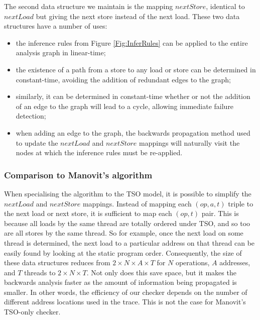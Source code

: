 \documentclass[11pt]{article}
\begin{document}
The second data structure we maintain is the mapping $nextStore$,
identical to $nextLoad$ but giving the next store instead of the next
load.  These two data structures have a number of uses:

\begin{itemize}

\item the inference rules from Figure \ref{Fig:InferRules} can be
applied to the entire analysis graph in linear-time;

\item the existence of a path from a store to any load or store can
be determined in constant-time, avoiding the addition of
redundant edges to the graph;

\item similarly, it can be determined in constant-time whether or not
the addition of an edge to the graph will lead to a cycle, allowing
immediate failure detection;

\item when adding an edge to the graph, the backwards propagation
method used to update the $nextLoad$ and $nextStore$ mappings will
naturally visit the nodes at which the inference rules must be
re-applied.

\end{itemize}

\subsubsection*{Comparison to Manovit's algorithm}

When specialising the algorithm to the TSO model, it is possible to
simplify the $nextLoad$ and $nextStore$ mappings.  Instead of mapping
each $(op, a, t)$ triple to the next load or next store, it is
sufficient to map each $(op, t)$ pair.  This is because all loads by
the same thread are totally ordered under TSO, and so too are all
stores by the same thread.  So for example, once the next load on some
thread is determined, the next load to a particular address on that
thread can be easily found by looking at the static program order.
Consequently, the size of these data structures reduces from $2 \times
N \times A \times T$ for $N$ operations, $A$ addresses, and $T$
threads to $2 \times N \times T$.  Not only does this save space, but
it makes the backwards analysis faster as the amount of information
being propagated is smaller.  In other words, the efficiency of our
checker depends on the number of different address locations used in
the trace.  This is not the case for Manovit's TSO-only checker.
\end{document}

